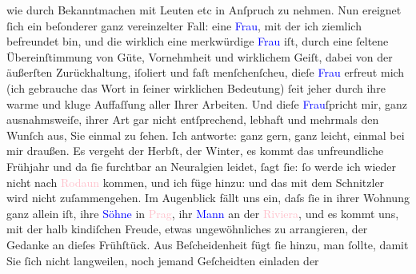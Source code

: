                wie durch Bekanntmachen mit Leuten etc in Anſpruch zu nehmen.\pend
           \pstart
           Nun ereignet ſich ein beſonderer ganz vereinzelter Fall: eine \textcolor{blue}{Frau}{}, mit der ich ziemlich befreundet bin, {\pb}und die wirklich eine merkwürdige
                  \textcolor{blue}{Frau}{} iſt, durch eine ſeltene
               Übereinſtimmung von Güte, Vornehmheit und wirklichem Geiſt, dabei von der äußerſten
               Zurückhaltung, iſoliert und faſt menſchenſcheu, dieſe \textcolor{blue}{Frau}{} erfreut mich (ich gebrauche das Wort in ſeiner
               wirklichen Bedeutung) ſeit jeher durch ihre warme {\pb}und kluge Auffaſſung aller Ihrer
               Arbeiten. Und dieſe \textcolor{blue}{Frau}{}\strikeout{,}{ }ſpricht mir, ganz ausnahmsweiſe, ihrer Art gar
               nicht entſprechend, lebhaft und mehrmals den Wunſch aus, Sie einmal zu ſehen. Ich
               antworte: ganz gern, ganz leicht, einmal bei mir draußen. Es vergeht der Herbſt, der
               Winter, es {\pb}kommt das
               unfreundliche Frühjahr und da ſie furchtbar an Neuralgien leidet, ſagt ſie: ſo werde
               ich wieder nicht nach \textcolor{pink}{Rodaun}{}\ledrightnote{\textcolor{pink}{Rodaun}} kommen, und ich füge
               hinzu: und das mit dem Schnitzler wird nicht zuſammengehen. Im Augenblick fällt uns
               ein, daſs ſie in ihrer Wohnung {\pb}ganz allein iſt, ihre \textcolor{blue}{Söhne}{} in \textcolor{pink}{Prag}{}\ledrightnote{\textcolor{pink}{Prag}}, ihr \textcolor{blue}{Mann}{} an der \textcolor{pink}{Riviera}{}\ledrightnote{\textcolor{pink}{Riviera}}, und es kommt uns, mit der halb kindiſchen Freude, etwas
               ungewöhnliches zu arrangieren, der Gedanke an dieſes Frühſtück. Aus Beſcheidenheit
               fügt ſie hinzu, man ſollte, damit Sie ſich nicht langweilen, noch {\pb}jemand Geſcheidten einladen der
